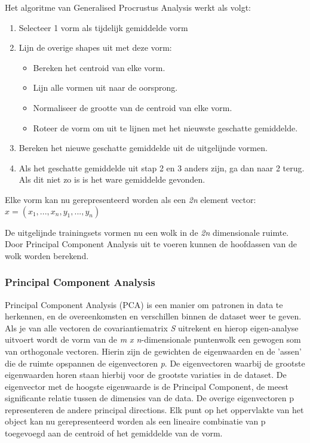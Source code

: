 Het algoritme van Generalised Procrustus Analysis werkt als volgt\cite{gpa}:
\begin{enumerate}
	\item Selecteer 1 vorm als tijdelijk gemiddelde vorm
	\item Lijn de overige shapes uit met deze vorm:
	\begin{itemize}
		\item Bereken het centroid van elke vorm.
		\item Lijn alle vormen uit naar de oorsprong.
		\item Normaliseer de grootte van de centroid van elke vorm.
		\item Roteer de vorm om uit te lijnen met het nieuwste geschatte gemiddelde.
	\end{itemize}
	\item Bereken het nieuwe geschatte gemiddelde uit de uitgelijnde vormen.
	\item Als het geschatte gemiddelde uit stap 2 en 3 anders zijn, ga dan naar 2 terug. Als dit niet zo is is het ware gemiddelde gevonden.
\end{enumerate}

Elke vorm kan nu gerepresenteerd worden als een \textit{2n} element vector:\
$x = (x_{1},...,x_{n},y_{1},...,y_{n})$ 

De uitgelijnde trainingsets vormen nu een wolk in de \textit{2n} dimensionale ruimte. Door Principal Component Analysis uit te voeren kunnen de hoofdassen van de wolk worden berekend.

\subsubsection{Principal Component Analysis}

Principal Component Analysis (PCA) is een manier om patronen in data te herkennen, en de overeenkomsten en verschillen binnen de dataset weer te geven.\cite{pca}
Als je van alle vectoren de covariantiematrix \textit{S} uitrekent en hierop eigen-analyse uitvoert wordt de vorm van de \textit{m x n}-dimensionale puntenwolk een gewogen som van orthogonale vectoren. Hierin zijn de gewichten de eigenwaarden \lambda en de 'assen' die de ruimte opspannen de eigenvectoren \textit{p}. 
De eigenvectoren waarbij de grootste eigenwaarden horen staan hierbij voor de grootste variaties in de dataset. 
De eigenvector met de hoogste eigenwaarde is de Principal Component, de meest significante relatie tussen de dimensies van de data. 
De overige eigenvectoren p representeren de andere principal directions. Elk punt op het oppervlakte van het object kan nu gerepresenteerd worden als een lineaire combinatie van p toegevoegd aan de centroid of het gemiddelde van de vorm.

